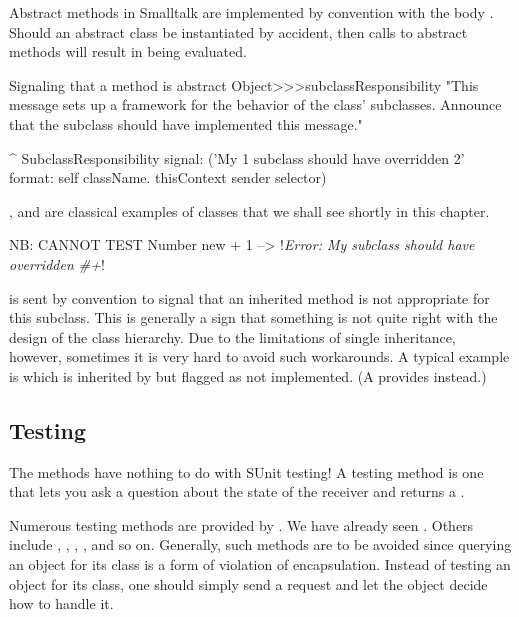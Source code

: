 \documentclass[a4paper,10pt,twoside]{book}
\begin{document}
Abstract methods in Smalltalk are implemented by convention with the body .
Should an abstract class be instantiated by accident, then calls to abstract methods will result in  being evaluated.

\begin{method}{Signaling that a method is abstract}
Object>>>subclassResponsibility
    "This message sets up a framework for the behavior of the class' subclasses.
    Announce that the subclass should have implemented this message."

    ^ SubclassResponsibility
        signal: ('My {1} subclass should have overridden {2}'
            format: {self className. thisContext sender selector})
\end{method}

,  and  are classical examples of  classes that we shall see shortly in this chapter.

\begin{code}{NB: CANNOT TEST}
Number new + 1 --> !\emph{Error: My subclass should have overridden \#+}!
\end{code}

 is sent by convention to signal that an inherited method is not appropriate for this subclass.
This is generally a sign that something is not quite right with the design of the class hierarchy.
Due to the limitations of single inheritance, however, sometimes it is very hard to avoid such workarounds. 
A typical example is  which is inherited by  but flagged as not implemented.
(A  provides  instead.)


\subsection{Testing}

The  methods have nothing to do with SUnit testing!
A testing method is one that lets you ask a question about the state of the receiver and returns a .

Numerous testing methods are provided by .
We have already seen .
Others include , , , , and so on.
Generally, such methods are to be avoided since querying an object for its class is a form of violation of encapsulation.
Instead of testing an object for its class, one should simply send a request and let the object decide how to handle it.
\end{document}
